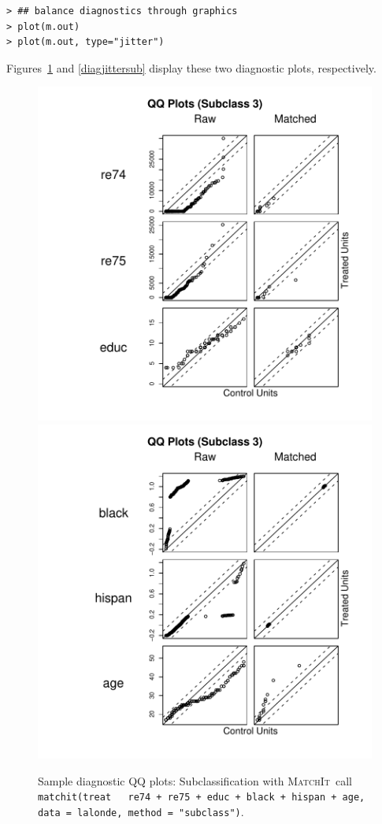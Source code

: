 \documentclass[oneside,letterpaper,titlepage]{article}
\newcommand{\MatchIt}{\textsc{MatchIt}}
\begin{document}
\begin{verbatim}
> ## balance diagnostics through graphics
> plot(m.out)
> plot(m.out, type="jitter")
\end{verbatim}    
Figures~\ref{diagqqsub} and \ref{diagjittersub} display these two
diagnostic plots, respectively.
\begin{figure}[tbp]
  \begin{center}
    {\includegraphics[scale=.7]{figs/qqplotsub}}
    {\includegraphics[scale=.7]{figs/qqplotsub2}}
    \hfill
    \caption{Sample diagnostic QQ plots: Subclassification with
      \MatchIt\ call \texttt{matchit(treat ~ re74 + re75 + educ +
        black + hispan + age, data = lalonde, method = "subclass")}.}
\label{diagqqsub}
\end{center}
\end{figure}
\end{document}
